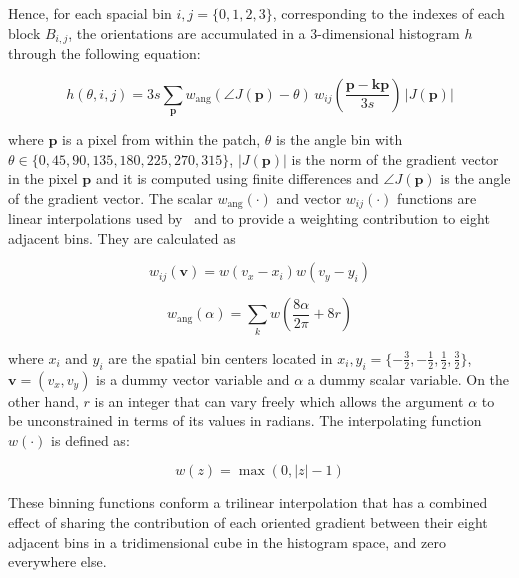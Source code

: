 \documentclass[utf8]{frontiersSCNS} %
\begin{document}
 Hence, for each spacial bin $ i,j = \{0,1,2,3\} $, corresponding to the indexes of each block $B_{i,j}$,  the orientations are accumulated in a  $3$-dimensional histogram $h$ through the following equation: 
 

\begin{equation}
 h(\theta,i,j) = 3 s \sum_{\mathbf{p}} w_\mathrm{ang}(\angle J(\mathbf{p}) - \theta)\, w_{ij}\left(\frac{\mathbf{p} - \mathbf{kp}}{3 s}\right)\, |J(\mathbf{p})|
\label{eq:histogram}
\end{equation}

\noindent  where $\mathbf{p}$ is a pixel from within the patch,  $\theta$ is the angle bin with $ \theta \in \{0, 45, 90, 135, 180, 225, 270, 315\} $,  $ |J(\mathbf{p})| $ is the norm of the gradient vector in the pixel $\mathbf{p}$ and it is computed using finite differences and $\angle J(\mathbf{p}) $ is the angle of the gradient vector.  The scalar $ w_\mathrm{ang}(\cdot) $  and vector $ w_{ij}(\cdot) $ functions are linear interpolations used by~\cite{Lowe2004} and \cite{Vedaldi2010} to provide a weighting contribution to eight adjacent bins.  They are calculated as  

\begin{equation}
 w_{ij}(\mathbf{v}) = w( v_x - x_i ) w( v_y - y_i ) 
\label{eq:ij}
\end{equation}

\begin{equation}
 w_\mathrm{ang}(\alpha) = \sum_{k} w( \frac{8\alpha}{2\pi} + 8r)
\label{eq:wang}
\end{equation}

\noindent where $x_i$ and $y_i$ are the spatial bin centers located in $ x_i,y_i = \{-\frac{3}{2},-\frac{1}{2},\frac{1}{2},\frac{3}{2}\} $, $\mathbf{v} = ( v_x, v_y ) $ is a dummy vector variable and $\alpha$ a dummy scalar variable.  On the other hand, $r$ is an integer that can vary freely which allows the argument $\alpha$ to be unconstrained in terms of its values in radians. The interpolating function $w(\cdot)$ is defined as:

\begin{equation}
 w(z) = \max(0,|z|-1)
\label{eq:weighting}
\end{equation}

These binning functions conform a trilinear interpolation that has a combined effect of sharing the contribution of each oriented gradient between their eight adjacent bins in a tridimensional cube in the histogram space, and zero everywhere else.
\end{document}
